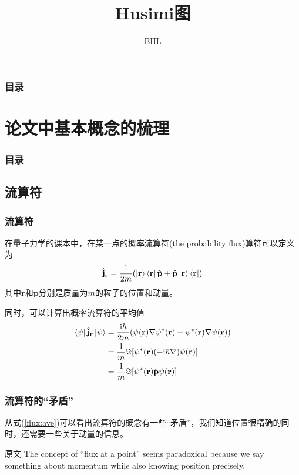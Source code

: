 \documentclass[UTF8]{beamer}
\title{Husimi图}
\author{BHL}
\begin{document}
\frame{\titlepage}
\begin{frame}\frametitle{目录}
	\tableofcontents
\end{frame}
%
\section{论文中基本概念的梳理}
\begin{frame}\frametitle{目录}
	\tableofcontents[currentsection]
\end{frame}
\subsection{流算符}
\begin{frame}\frametitle{流算符}
	在量子力学的课本中，在某一点的概率流算符(the probability flux)算符可以定义为
	\begin{equation}
		\hat{\mathbf{j}}_{\mathbf{r}} = \frac{1}{2m}(\ket{\mathbf{r}}\bra{\mathbf{r}}\hat{\mathbf{p}}+\hat{\mathbf{p}}\ket{\mathbf{r}}\bra{\mathbf{r}})
		\label{flux:def}
	\end{equation}
	其中$\mathbf{r}$和$\mathbf{p}$分别是质量为$m$的粒子的位置和动量。

	同时，可以计算出概率流算符的平均值
	\begin{equation}
		\begin{aligned}
			\bra{\psi}\hat{\mathbf{j}}_{\mathbf{r}}\ket{\psi} & =
			\frac{\mathrm{i}\hbar}{2m}(\mathrm{\psi}(\mathbf{r})\nabla\mathrm{\psi}^{*}(\mathbf{r})-\mathrm{\psi}^{*}(\mathbf{r})\nabla\mathrm{\psi}(\mathbf{r}))                                                                                                                                                   \\
			                                                  & =\frac{1}{m}\Im[\mathrm{\psi}^{*}(\mathbf{r})(-\mathrm{i}\hbar\nabla)\mathrm{\psi}(\mathbf{r})] \\
			                                                  & =\frac{1}{m}\Im[\mathrm{\psi}^{*}(\mathbf{r})\hat{\mathbf{p}}\mathrm{\psi}(\mathbf{r})]
			\label{flux:ave}
		\end{aligned}
	\end{equation}
\end{frame}
\begin{frame}\frametitle{流算符的“矛盾”}
	从式(\ref{flux:ave})可以看出流算符的概念有一些“矛盾”，我们知道位置很精确的同时，还需要一些关于动量的信息。\\
	\begin{block}{原文\cite{mason2013quantum}}
		The concept of “flux at a point” seems paradoxical because we say something about momentum while also knowing position precisely.
	\end{block}
\end{frame}
\end{document}
